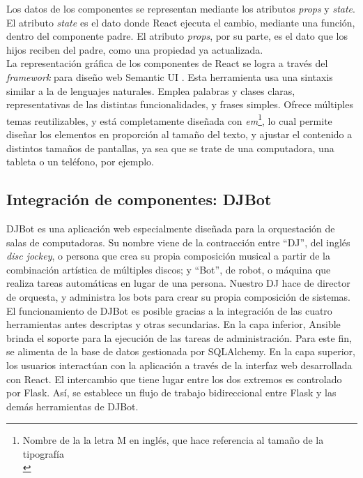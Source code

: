 \documentclass[a4paper,12pt]{article}
\begin{document}
Los datos de los componentes se representan mediante los atributos \emph{props} y \emph{state}. El atributo \emph{state} es el dato donde React ejecuta el cambio, mediante una función, dentro del componente padre. El atributo \emph{props}, por su parte, es el dato que los hijos reciben del padre, como una propiedad ya actualizada.\\

La representación gráfica de los componentes de React se logra a través del \emph{framework} para diseño web Semantic UI \cite{SemanticUI}. Esta herramienta usa una sintaxis similar a la de lenguajes naturales. Emplea palabras y clases claras, representativas de las distintas funcionalidades, y frases simples. Ofrece múltiples temas reutilizables, y está completamente diseñada con \emph{em}\footnote{Nombre de la la letra M en inglés, que hace referencia al tamaño de la tipografía\\}, lo cual permite diseñar los elementos en proporción al tamaño del texto, y ajustar el contenido a distintos tamaños de pantallas, ya sea que se trate de una computadora, una tableta o un teléfono, por ejemplo.\\

\subsection{Integración de componentes: DJBot}
\label{sec:orgheadline18}

DJBot es una aplicación web especialmente diseñada para la orquestación de salas de computadoras. Su nombre viene de la contracción entre “DJ”, del inglés \emph{disc jockey}, o persona que crea su propia composición musical a partir de la combinación artística de múltiples discos; y “Bot”, de robot, o máquina que realiza tareas automáticas en lugar de una persona. Nuestro DJ hace de director de orquesta, y administra los bots para crear su propia composición de sistemas.\\

El funcionamiento de DJBot es posible gracias a la integración de las cuatro herramientas antes descriptas y otras secundarias. En la capa inferior, Ansible brinda el soporte para la ejecución de las tareas de administración. Para este fin, se alimenta de la base de datos gestionada por SQLAlchemy. En la capa superior, los usuarios interactúan con la aplicación a través de la interfaz web desarrollada con React. El intercambio que tiene lugar entre los dos extremos es controlado por Flask. Así, se establece un flujo de trabajo bidireccional entre Flask y las demás herramientas de DJBot.\\
\end{document}
